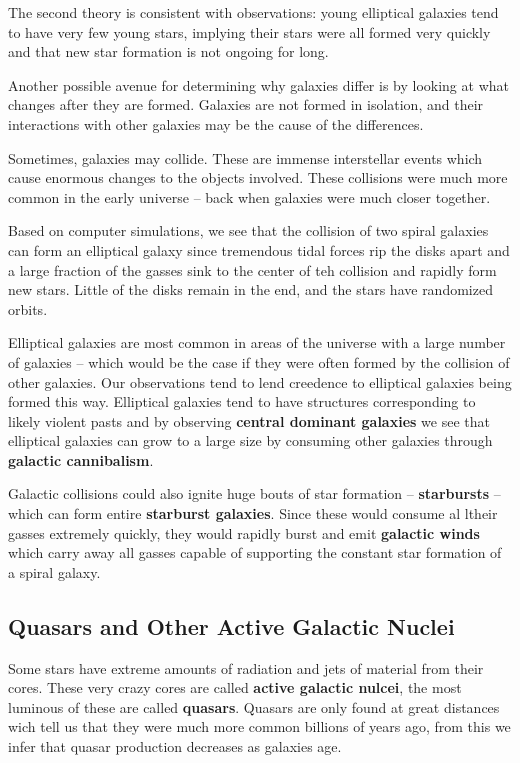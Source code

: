 \documentclass[12pt]{article}
\begin{document}
The second theory is consistent with observations: young elliptical galaxies tend to have very few young stars, implying their stars were all formed very quickly and that new star formation is not ongoing for long.

Another possible avenue for determining why galaxies differ is by looking at what changes after they are formed. Galaxies are not formed in isolation, and their interactions with other galaxies may be the cause of the differences.

Sometimes, galaxies may collide. These are immense interstellar events which cause enormous changes to the objects involved. These collisions were much more common in the early universe -- back when galaxies were much closer together.

Based on computer simulations, we see that the collision of two spiral galaxies can form an elliptical galaxy since tremendous tidal forces rip the disks apart and a large fraction of the gasses sink to the center of teh collision and rapidly form new stars. Little of the disks remain in the end, and the stars have randomized orbits.

Elliptical galaxies are most common in areas of the universe with a large number of galaxies -- which would be the case if they were often formed by the collision of other galaxies. Our observations tend to lend creedence to elliptical galaxies being formed this way. Elliptical galaxies tend to have structures corresponding to likely violent pasts and by observing {\bf central dominant galaxies} we see that elliptical galaxies can grow to a large size by consuming other galaxies through {\bf galactic cannibalism}.

Galactic collisions could also ignite huge bouts of star formation -- {\bf starbursts} -- which can form entire {\bf starburst galaxies}. Since these would consume al ltheir gasses extremely quickly, they would rapidly burst and emit {\bf galactic winds} which carry away all gasses capable of supporting the constant star formation of a spiral galaxy.

\subsection{Quasars and Other Active Galactic Nuclei}
Some stars have extreme amounts of radiation and jets of material from their cores. These very crazy cores are called \textbf{active galactic nulcei}, the most luminous of these are called \textbf{quasars}. Quasars are only found at great distances wich tell us that they were much more common billions of years ago, from this we infer that quasar production decreases as galaxies age.
\end{document}
